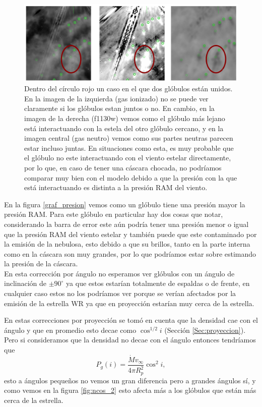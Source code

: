 \documentclass{book}
\begin{document}
\begin{figure}[htb]
    \centering
    \includegraphics[width=\textwidth]{Nuevas imagenes finales/multiples_glo.pdf}
    \caption{Dentro del círculo rojo un caso en el que dos glóbulos están unidos. En la imagen de la izquierda (gas ionizado) no se puede ver claramente si los glóbulos estan juntos o no.  En cambio, en la imagen de la derecha (f1130w) vemos como el glóbulo más lejano está interactuando con la estela del otro glóbulo cercano, y en la imagen central (gas neutro) vemos como sus partes neutras parecen estar incluso juntas. En situaciones como esta, es muy probable que el glóbulo no este interactuando con el viento estelar directamente, por lo que, en caso de tener una cáscara chocada, no podríamos comparar muy bien con el modelo debido a que la presión con la que está interactuando es distinta a la presión RAM del viento.}
    \label{fig:multiples_glo}
\end{figure}

En la figura \ref{graf_presion} vemos como un glóbulo tiene una presión mayor la presión RAM. Para este glóbulo en particular hay dos cosas que notar, considerando la barra de error este aún podría tener una presión menor o igual que la presión RAM del viento estelar y también puede que este contaminado por la emisión de la nebulosa, esto debido a que su brillos, tanto en la parte interna como en la cáscara son muy grandes, por lo que podríamos estar sobre estimando la presión de la cáscara.\\

En esta corrección por ángulo no esperamos ver glóbulos con un ángulo de inclinación de $\pm 90^\circ$ ya que estos estarían totalmente de espaldas o de frente, en cualquier caso estos no los podríamos ver porque se verían afectados por la emisión de la estrella WR ya que en proyección estarían muy cerca de la estrella.

En estas correcciones por proyección se tomó en cuenta que la densidad cae con el ángulo y que en promedio esto decae como $\cos^{1/2}{i}$ (Sección \ref{Sec:proyeccion}). Pero si consideramos que la densidad no decae con el ángulo entonces tendríamos que 
\[P_g(i)= \frac{\dot{M}v_\infty}{4\pi R_p^2}\cos^2 i,\] esto a ángulos pequeños no vemos un gran diferencia pero a grandes ángulos sí, y como vemos en la figura \ref{fig:ncos_2} esto afecta más a los glóbulos que están más cerca de la estrella. 
\end{document}
